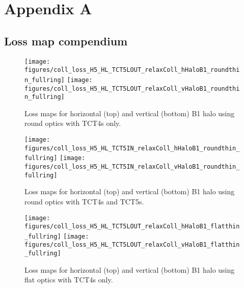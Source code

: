 \section{Appendix A}

\subsection{Loss map compendium}


\begin{figure}
\begin{center}
\vskip-12mm
\texttt{[image: figures/coll\_loss\_H5\_HL\_TCT5LOUT\_relaxColl\_hHaloB1\_roundthin\_fullring]}
\texttt{[image: figures/coll\_loss\_H5\_HL\_TCT5LOUT\_relaxColl\_vHaloB1\_roundthin\_fullring]}
\end{center}
\vspace{-0.3cm}
 \caption{Loss maps for horizontal (top) and vertical (bottom) B1 halo using round optics with TCT4s only.
  \label{fullring_roundB1_TCT5LOUT }}
\end{figure}

\begin{figure}
\begin{center}
\vskip-12mm
\texttt{[image: figures/coll\_loss\_H5\_HL\_TCT5IN\_relaxColl\_hHaloB1\_roundthin\_fullring]}
\texttt{[image: figures/coll\_loss\_H5\_HL\_TCT5IN\_relaxColl\_vHaloB1\_roundthin\_fullring]}
\end{center}
\vspace{-0.3cm}
 \caption{Loss maps for horizontal (top) and vertical (bottom) B1 halo using round optics with TCT4s and TCT5s.
  \label{fullring_roundB1_TCT5IN}}
\end{figure}


\begin{figure}
\begin{center}
\vskip-12mm
\texttt{[image: figures/coll\_loss\_H5\_HL\_TCT5LOUT\_relaxColl\_hHaloB1\_flatthin\_fullring]}
\texttt{[image: figures/coll\_loss\_H5\_HL\_TCT5LOUT\_relaxColl\_vHaloB1\_flatthin\_fullring]}
\end{center}
\vspace{-0.3cm}
 \caption{Loss maps for horizontal (top) and vertical (bottom) B1 halo using flat optics with TCT4s only.
  \label{fullring_flatB1_TCT5LOUT}}
\end{figure}

